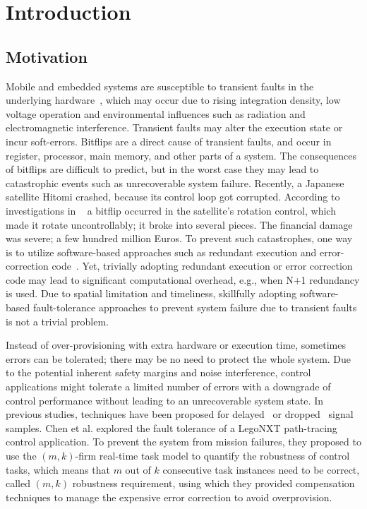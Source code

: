 \chapter{Introduction}
\section{Motivation}
Mobile and embedded systems are susceptible to transient faults in the underlying hardware~\cite{1545891}, which may occur due to rising integration density, low voltage operation and environmental influences such as radiation and electromagnetic interference. Transient faults may alter the execution state or incur soft-errors. Bitflips are a direct cause of transient faults, and occur in register, processor, main memory, and other parts of a system.
The consequences of bitflips are difficult to predict, but in the worst case they may lead to catastrophic events such as unrecoverable system failure. Recently, a Japanese satellite Hitomi crashed, because its control loop got corrupted. According to investigations in ~\cite{hitomi} a bitflip occurred in the satellite's rotation control, which made it rotate uncontrollably; it broke into several pieces. The financial damage was severe; a few hundred million Euros.
To prevent such catastrophes, one way is to utilize software-based approaches such as redundant execution and error-correction code~\cite{1395730, 994913, 6513800, 4700445, 1137644}. %
Yet, trivially adopting redundant execution or error
correction code may lead to significant computational  overhead, e.g., when N+1 redundancy is used. Due  to  spatial
limitation  and  timeliness,  skillfully  adopting  software-based
fault-tolerance  approaches  to  prevent system  failure  due  to  transient
faults is not a trivial problem.

Instead of over-provisioning with extra hardware or execution time, sometimes errors can be tolerated; there may be no need to protect the whole system. Due to the potential inherent
safety  margins  and  noise  interference,  control  applications
might  tolerate  a  limited  number  of  errors  with  a  downgrade
of  control  performance  without  leading  to  an  unrecoverable
system state. In previous studies, techniques have been proposed for delayed~\cite{Ramanathan:1999:OMR:307977.307993, 6241580} or dropped~\cite{4739306,7153812} signal samples. Chen et al. \cite{Chen2016}  explored  the  fault  tolerance  of  a
LegoNXT  path-tracing  control  application.  To  prevent the  system  from mission  failures, they  proposed  to use the $(m,k)$-firm real-time task model to quantify the robustness of control tasks, which means that $m$ out of $k$
consecutive task  instances  need  to  be  correct, called $(m,k)$
robustness  requirement,  using which they provided compensation techniques to manage the expensive error correction to avoid overprovision. 


